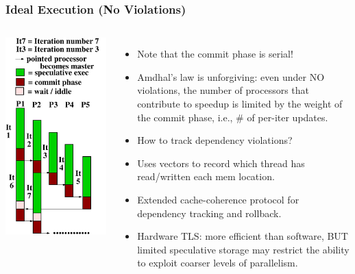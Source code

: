\documentclass{beamer}
\newcommand{\emp}[1]{\textcolor{DikuRed}{ #1}}
\begin{document}
\begin{frame}[fragile,t]
  \frametitle{Ideal Execution (No Violations)}

\begin{columns}
\includegraphics[width=22ex]{Figures/FigsTLS/IdealCommit.pdf}\pause
{}
\begin{itemize}
\item Note that the commit phase is serial!
\item Amdhal's law is unforgiving: even under 
        NO violations, the number of processors 
        that contribute
        to speedup is limited by the weight
        of the commit phase, i.e., \#
        of per-iter updates.\medskip

\item \emp{How to track dependency violations?}
\item Uses vectors to record which thread has
        read/written each mem location.
\item Extended cache-coherence protocol for
        dependency tracking and rollback.
\item Hardware TLS: more efficient than software, BUT
        limited speculative storage may restrict the ability
        to exploit coarser levels of parallelism. 
\end{itemize}
\end{columns}

\end{frame}
\end{document}
